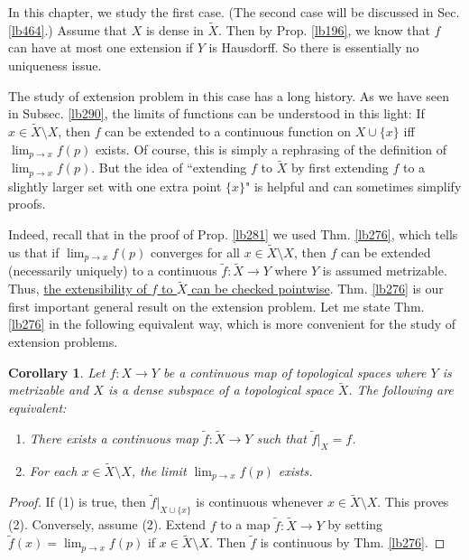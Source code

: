\documentclass[12pt,b5paper,notitlepage]{article}
\theoremstyle{definition}
\theoremstyle{plain}
\newtheorem{co}[df]{Corollary}
\newcommand{\wtd}{\widetilde}
\numberwithin{equation}{section}
\begin{document}
In this chapter, we study the first case. (The second case will be discussed in Sec. \ref{lb464}.) Assume that $X$ is dense in $\wtd X$. Then by Prop. \ref{lb196}, we know that $f$ can have at most one extension if $Y$ is Hausdorff. So there is essentially no uniqueness issue. 


The study of extension problem in this case has a long history. As we have seen in Subsec. \ref{lb290}, the limits of functions can be understood in this light: If $x\in\wtd X\setminus X$, then $f$ can be extended to a continuous function on $X\cup\{x\}$ iff $\lim_{p\rightarrow x}f(p)$ exists. Of course, this is simply a rephrasing of the definition of $\lim_{p\rightarrow x}f(p)$. But the idea of ``extending $f$ to $\wtd X$ by first extending $f$ to a slightly larger set with one extra point $\{x\}$" is helpful and can sometimes simplify proofs.

Indeed, recall that in the proof of Prop. \ref{lb281} we used Thm. \ref{lb276}, which tells us that if $\lim_{p\rightarrow x}f(p)$ converges for all $x\in\wtd X\setminus X$, then $f$ can be extended (necessarily uniquely) to a continuous $\wtd f:\wtd X\rightarrow Y$ where $Y$ is assumed metrizable. Thus, \uline{the extensibility of $f$ to $\wtd X$ can be checked pointwise}. Thm. \ref{lb276} is our first important general result on the extension problem. Let me state Thm. \ref{lb276} in the following equivalent way, which is more convenient for the  study of extension problems.
\begin{co}\label{lb307}
Let $f:X\rightarrow Y$ be a continuous map of topological spaces where $Y$ is metrizable and $X$ is a dense subspace of a topological space $\wtd X$. The following are equivalent:
\begin{enumerate}[label=(\arabic*)]
\item There exists a continuous map $\wtd f:\wtd X\rightarrow Y$ such that $\wtd f|_X= f$.
\item For each $x\in\wtd X\setminus X$, the limit $\lim_{p\rightarrow x}f(p)$ exists.
\end{enumerate}
\end{co}

\begin{proof}
If (1) is true, then $\wtd f|_{X\cup\{x\}}$ is continuous whenever $x\in\wtd X\setminus X$. This proves (2). Conversely, assume (2). Extend $ f$ to a map $\wtd f:\wtd X\rightarrow Y$ by setting $\wtd f(x)=\lim_{p\rightarrow x}f(p)$ if $x\in\wtd X\setminus X$. Then $\wtd f$ is continuous by Thm. \ref{lb276}.
\end{proof}
\end{document}
